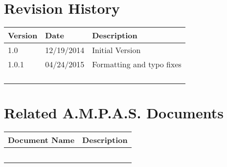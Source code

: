 \prelimsectionformat	%
\chapter{Revision History}

\begin{tabularx}{\linewidth}{|l|l|X|}
    \hline
    Version & Date       & Description \\ \hline
    1.0     & 12/19/2014 & Initial Version
    \\ \hline
    1.0.1   & 04/24/2015 & Formatting and typo fixes \\ \hline
    &   &   \\ \hline
    &   &   \\ \hline
    &   &   \\ \hline
    &   &   \\ \hline
\end{tabularx}

\vspace{0.25in} %
\chapter{Related A.M.P.A.S. Documents} %
\begin{tabularx}{\linewidth}{|l|X|}
    \hline
    Document Name & Description \\ \hline
    & \\ \hline
    & \\ \hline
    & \\ \hline
    & \\ \hline
    & \\ \hline
\end{tabularx}